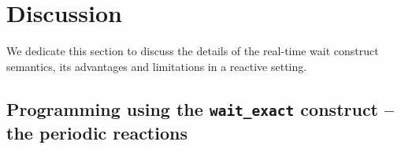 \section{Discussion}
\label{sec:disc-perc-limit}

We dedicate this section to discuss the details of the real-time wait
construct semantics, its advantages and limitations in a reactive
setting.

\subsection{Programming using the \texttt{wait\_exact} construct -- the
  periodic reactions}
\label{sec:progr-using-delay}







